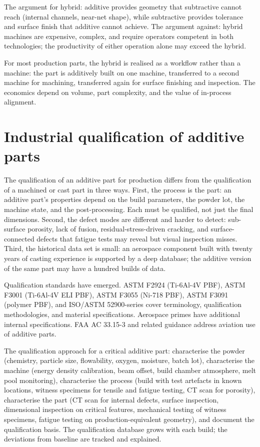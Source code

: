 The argument for hybrid: additive provides geometry that subtractive cannot reach (internal channels, near-net shape), while subtractive provides tolerance and surface finish that additive cannot achieve. The argument against: hybrid machines are expensive, complex, and require operators competent in both technologies; the productivity of either operation alone may exceed the hybrid.

For most production parts, the hybrid is realised as a workflow rather than a machine: the part is additively built on one machine, transferred to a second machine for machining, transferred again for surface finishing and inspection. The economics depend on volume, part complexity, and the value of in-process alignment.

\section{Industrial qualification of additive parts}

The qualification of an additive part for production differs from the qualification of a machined or cast part in three ways. First, the process is the part: an additive part's properties depend on the build parameters, the powder lot, the machine state, and the post-processing. Each must be qualified, not just the final dimensions. Second, the defect modes are different and harder to detect: sub-surface porosity, lack of fusion, residual-stress-driven cracking, and surface-connected defects that fatigue tests may reveal but visual inspection misses. Third, the historical data set is small: an aerospace component built with twenty years of casting experience is supported by a deep database; the additive version of the same part may have a hundred builds of data.

Qualification standards have emerged. ASTM F2924 (Ti-6Al-4V PBF), ASTM F3001 (Ti-6Al-4V ELI PBF), ASTM F3055 (Ni-718 PBF), ASTM F3091 (polymer PBF), and ISO/ASTM 52900-series cover terminology, qualification methodologies, and material specifications. Aerospace primes have additional internal specifications. FAA AC 33.15-3 and related guidance address aviation use of additive parts.

The qualification approach for a critical additive part: characterise the powder (chemistry, particle size, flowability, oxygen, moisture, batch lot), characterise the machine (energy density calibration, beam offset, build chamber atmosphere, melt pool monitoring), characterise the process (build with test artefacts in known locations, witness specimens for tensile and fatigue testing, CT scan for porosity), characterise the part (CT scan for internal defects, surface inspection, dimensional inspection on critical features, mechanical testing of witness specimens, fatigue testing on production-equivalent geometry), and document the qualification basis. The qualification database grows with each build; the deviations from baseline are tracked and explained.

